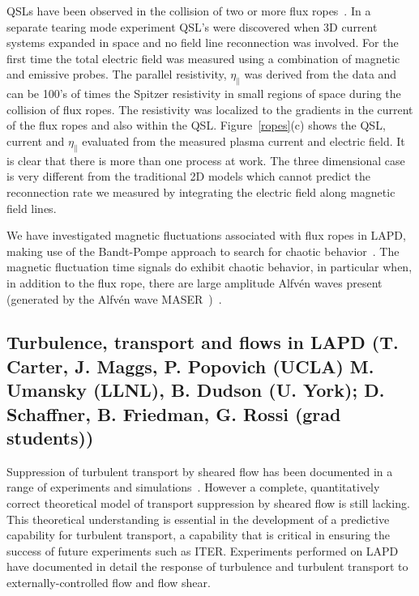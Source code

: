\documentclass[11pt]{article}
\renewcommand{\cite}{\citep}
\begin{document}
QSLs have been observed in the collision of two or more flux
ropes~\cite{gekelman:2010,vancompernolle:2011}. In a separate tearing mode experiment QSL's
were discovered when 3D current systems expanded in space and no field
line reconnection was involved. For the first time the total electric
field was measured using a
combination of magnetic and emissive probes. The parallel resistivity,
$\eta_\parallel$ was derived from the data and can
be 100's of times the Spitzer resistivity in small regions of space
during the collision of flux ropes. The resistivity was localized to the
gradients in the current of the flux ropes and also within the QSL.
Figure~\ref{ropes}(c) shows the QSL, current and $\eta_\parallel$
evaluated from the measured plasma current and electric field.
It is clear that there is more than one process at work. The three
dimensional case is very different from the traditional 2D models which
cannot predict the reconnection rate we measured by integrating the
electric field along magnetic field lines.

We have investigated magnetic fluctuations associated with flux ropes
in LAPD, making use of the Bandt-Pompe approach to search for chaotic
behavior~\cite{bandt:2002,rosso:2007}.  The magnetic fluctuation time
signals do exhibit chaotic behavior, in particular when, in addition
to the flux rope, there are large amplitude Alfv\'{e}n waves present
(generated by the Alfv\'{e}n wave
MASER~\cite{maggs:2003,maggs:2005})~\cite{gekelman:2014}.


\subsection{Turbulence, transport and flows in LAPD (T. Carter, J. Maggs, P.
Popovich (UCLA) M. Umansky (LLNL), B. Dudson (U. York); D. Schaffner, B.
Friedman, G. Rossi (grad students))}

Suppression of turbulent transport by sheared flow has been documented
in a range of experiments and simulations~\cite{terry:2000}.  However
a complete, quantitatively correct theoretical model of transport
suppression by sheared flow is still lacking.  This theoretical understanding is
essential in the development of a predictive capability for turbulent
transport, a capability that is critical in ensuring the success of
future experiments such as ITER. Experiments performed on LAPD have
documented in detail the response of turbulence and turbulent
transport to externally-controlled flow and flow shear.
\end{document}
